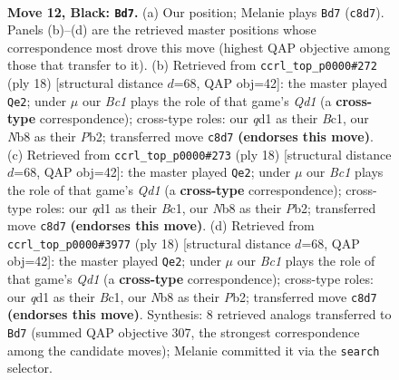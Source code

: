 \documentclass[11pt]{article}
\begin{document}
\clearpage

\begin{figure}[p]\centering
\begin{subfigure}{0.46\textwidth}\centering
\resizebox{\linewidth}{!}{%
\newchessgame
\chessboard[
  setfen={rnb2rk1/1p3ppp/p1q1pn2/8/1b6/2N1PN2/PP1BBPPP/R2Q1RK1 b - - 5 12},
  showmover=false,
  pgfstyle=straightmove, color=movearrow, markmove={c8-d7}
]}
\caption{}
\end{subfigure}\hfill
\begin{subfigure}{0.46\textwidth}\centering
\resizebox{\linewidth}{!}{%
\newchessgame
\chessboard[
  setfen={r1bq1rk1/pp2bppp/2n1p3/3n4/2BP4/2N2N2/PP3PPP/R1BQ1RK1 w - - 3 10},
  showmover=false,
  pgfstyle=straightmove, color=movearrow, markmove={d1-e2}
]}
\caption{}
\end{subfigure}
\\[4pt]
\begin{subfigure}{0.46\textwidth}\centering
\resizebox{\linewidth}{!}{%
\newchessgame
\chessboard[
  setfen={r1bq1rk1/pp2bppp/2n1p3/3n4/2BP4/2N2N2/PP3PPP/R1BQ1RK1 w - - 3 10},
  showmover=false,
  pgfstyle=straightmove, color=movearrow, markmove={d1-e2}
]}
\caption{}
\end{subfigure}\hfill
\begin{subfigure}{0.46\textwidth}\centering
\resizebox{\linewidth}{!}{%
\newchessgame
\chessboard[
  setfen={r1bq1rk1/pp2bppp/2n1p3/3n4/2BP4/2N2N2/PP3PPP/R1BQ1RK1 w - - 3 10},
  showmover=false,
  pgfstyle=straightmove, color=movearrow, markmove={d1-e2}
]}
\caption{}
\end{subfigure}
\caption{\textbf{Move 12, Black: \texttt{Bd7}.} (a) Our position; Melanie plays \texttt{Bd7} (\texttt{c8d7}). Panels (b)--(d) are the retrieved master positions whose correspondence most drove this move (highest QAP objective among those that transfer to it). (b) Retrieved from \texttt{ccrl\_top\_p0000\#272} (ply 18) [structural distance $d$=68, QAP obj=42]: the master played \texttt{Qe2}; under $\mu$ our \emph{Bc1} plays the role of that game's \emph{Qd1} (a \textbf{cross-type} correspondence); cross-type roles: our \emph{q}d1 as their \emph{B}c1, our \emph{N}b8 as their \emph{P}b2; transferred move \texttt{c8d7} \textbf{(endorses this move)}. (c) Retrieved from \texttt{ccrl\_top\_p0000\#273} (ply 18) [structural distance $d$=68, QAP obj=42]: the master played \texttt{Qe2}; under $\mu$ our \emph{Bc1} plays the role of that game's \emph{Qd1} (a \textbf{cross-type} correspondence); cross-type roles: our \emph{q}d1 as their \emph{B}c1, our \emph{N}b8 as their \emph{P}b2; transferred move \texttt{c8d7} \textbf{(endorses this move)}. (d) Retrieved from \texttt{ccrl\_top\_p0000\#3977} (ply 18) [structural distance $d$=68, QAP obj=42]: the master played \texttt{Qe2}; under $\mu$ our \emph{Bc1} plays the role of that game's \emph{Qd1} (a \textbf{cross-type} correspondence); cross-type roles: our \emph{q}d1 as their \emph{B}c1, our \emph{N}b8 as their \emph{P}b2; transferred move \texttt{c8d7} \textbf{(endorses this move)}. Synthesis: 8 retrieved analogs transferred to \texttt{Bd7} (summed QAP objective 307, the strongest correspondence among the candidate moves); Melanie committed it via the \texttt{search} selector.}
\label{fig:thought-m23}
\end{figure}
\end{document}
